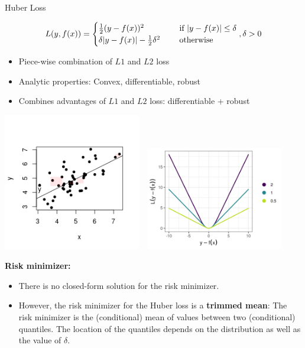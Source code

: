 \begin{vbframe}{Huber Loss}

\vspace*{-0.3cm}

$$
L(y, f(x)) = \begin{cases}
  \frac{1}{2}(y - f(x))^2  & \text{ if } |y - f(x)| \le \delta \\
  \delta |y - f(x)|-\frac{1}{2}\delta^2 \quad & \text{ otherwise }
  \end{cases}, \delta > 0
$$

\begin{itemize}
\item Piece-wise combination of $L1$ and $L2$ loss
\item Analytic properties: Convex, differentiable, robust
\item Combines advantages of $L1$ and $L2$ loss: differentiable + robust
\end{itemize}

\vspace*{-1cm}

\begin{center}
\includegraphics[width = 0.45\textwidth]{figure_man/loss_huber_plot3.png}~~\includegraphics[width = 0.45\textwidth]{figure_man/loss_huber_plot2.png}\\
\end{center}

\framebreak 

\textbf{Risk minimizer:}
\begin{itemize}
\item There is no closed-form solution for the risk minimizer. 
\item However, the risk minimizer for the Huber loss is a \textbf{trimmed mean}: The risk minimizer is the (conditional) mean of values between two (conditional) quantiles. The location of the quantiles depends on the distribution as well as 
the value of $\delta$. 
\end{itemize}


\end{vbframe}
